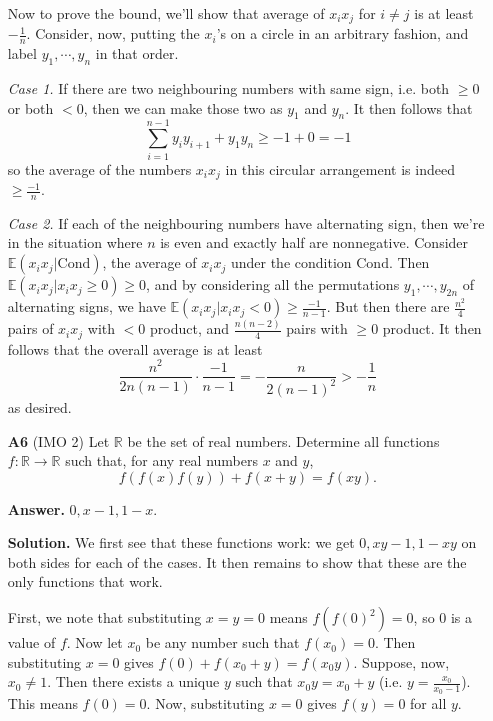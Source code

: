 \documentclass[11pt,a4paper]{article}
\begin{document}
\begin{enumerate}
	Now to prove the bound, we'll show that average of $x_ix_j$ for $i\neq j$ 
	is at least $-\frac{1}{n}$. 
	Consider, now, putting the $x_i$'s on a circle in an arbitrary fashion, 
	and label $y_1, \cdots, y_n$ in that order. 
	
	\emph{Case 1.} 
	If there are two neighbouring numbers with same sign, 
	i.e. both $\ge 0$ or both $<0$, 
	then we can make those two as $y_1$ and $y_n$. 
	It then follows that 
	\[
	\sum_{i=1}^{n-1}y_iy_{i+1}+y_1y_n\ge -1+0=-1
	\]
	so the average of the numbers $x_ix_j$ in this circular arrangement is indeed $\ge \frac{-1}{n}$. 
	
	\emph{Case 2.} 
	If each of the neighbouring numbers have alternating sign, 
	then we're in the situation where $n$ is even and exactly half are nonnegative. 
	Consider $\mathbb{E}(x_ix_j|\text{Cond})$, 
	the average of $x_ix_j$ under the condition $\text{Cond}$. 
	Then $\mathbb{E}(x_ix_j|x_ix_j\ge 0)\ge 0$, 
	and by considering all the permutations $y_1, \cdots, y_{2n}$ of alternating signs, 
	we have $\mathbb{E}(x_ix_j|x_ix_j< 0)\ge \frac{-1}{n-1}$. 
	But then there are $\frac{n^2}{4}$ pairs of $x_ix_j$ with $<0$ product, 
	and $\frac{n(n-2)}{4}$ pairs with $\ge 0$ product. 
	It then follows that the overall average is at least 
	\[
	\frac{n^2}{2n(n-1)}\cdot \frac{-1}{n-1}=-\frac{n}{2(n-1)^2} > -\frac{1}{n}
	\]
	as desired. 
	
	\item[\textbf{A6}] (IMO 2) 
	Let $\mathbb{R}$ be the set of real numbers. Determine all functions $f: \mathbb{R} \rightarrow \mathbb{R}$ such that, for any real numbers $x$ and $y$,\[ f(f(x)f(y)) + f(x+y) = f(xy). \]
	
	\textbf{Answer.} 
	$0, x - 1, 1 - x$. 
	
	\textbf{Solution.} 
	We first see that these functions work: we get $0, xy - 1, 1 - xy$ on both sides for each of the cases. 
	It then remains to show that these are the only functions that work. 
	
	First, we note that substituting $x=y=0$ means $f(f(0)^2)=0$, so 0 is a value of $f$. 
	Now let $x_0$ be any number such that $f(x_0)=0$. 
	Then substituting $x=0$ gives $f(0) + f(x_0 + y) = f(x_0y)$. 
	Suppose, now, $x_0 \neq 1$. 
	Then there exists a unique $y$ such that $x_0y = x_0 + y$ (i.e. $y = \frac{x_0}{x_0 - 1}$). 
	This means $f(0) = 0$. 
	Now, substituting $x=0$ gives $f(y) = 0$ for all $y$. 
	

\end{enumerate}
\end{document}
